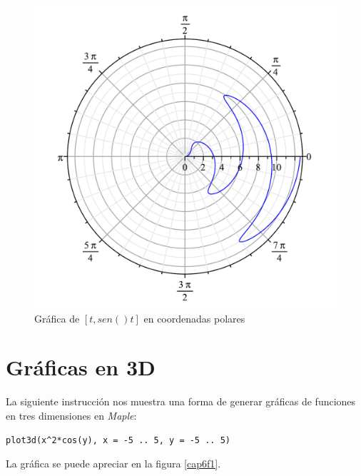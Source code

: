 \documentclass[letterpaper,12pt]{book}
\begin{document}
\begin{figure}[h!]
\centering
\includegraphics[scale=0.5]{grafica07.pdf}
\caption{Gráfica de $[t, sen()t]$ en coordenadas polares}\label{cap5f1}
\end{figure}

\chapter{Gráficas en 3D}

La siguiente instrucción nos muestra una forma de generar gráficas de funciones en tres dimensiones en \emph{Maple}:

\begin{verbatim}
plot3d(x^2*cos(y), x = -5 .. 5, y = -5 .. 5)
\end{verbatim}

La gráfica se puede apreciar en la figura \ref{cap6f1}.
\end{document}
